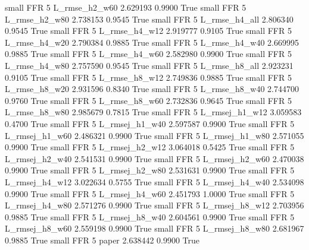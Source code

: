      small      FFR                 5  L_rmse_h2_w60   2.629193      0.9900    True
     small      FFR                 5  L_rmse_h2_w80   2.738153      0.9545    True
     small      FFR                 5  L_rmse_h4_all   2.806340      0.9545    True
     small      FFR                 5  L_rmse_h4_w12   2.919777      0.9105    True
     small      FFR                 5  L_rmse_h4_w20   2.790384      0.9885    True
     small      FFR                 5  L_rmse_h4_w40   2.669995      0.9885    True
     small      FFR                 5  L_rmse_h4_w60   2.582980      0.9900    True
     small      FFR                 5  L_rmse_h4_w80   2.757590      0.9545    True
     small      FFR                 5  L_rmse_h8_all   2.923231      0.9105    True
     small      FFR                 5  L_rmse_h8_w12   2.749836      0.9885    True
     small      FFR                 5  L_rmse_h8_w20   2.931596      0.8340    True
     small      FFR                 5  L_rmse_h8_w40   2.744700      0.9760    True
     small      FFR                 5  L_rmse_h8_w60   2.732836      0.9645    True
     small      FFR                 5  L_rmse_h8_w80   2.985679      0.7815    True
     small      FFR                 5 L_rmsej_h1_w12   3.059583      0.4700    True
     small      FFR                 5 L_rmsej_h1_w40   2.597587      0.9900    True
     small      FFR                 5 L_rmsej_h1_w60   2.486321      0.9900    True
     small      FFR                 5 L_rmsej_h1_w80   2.571055      0.9900    True
     small      FFR                 5 L_rmsej_h2_w12   3.064018      0.5425    True
     small      FFR                 5 L_rmsej_h2_w40   2.541531      0.9900    True
     small      FFR                 5 L_rmsej_h2_w60   2.470038      0.9900    True
     small      FFR                 5 L_rmsej_h2_w80   2.531631      0.9900    True
     small      FFR                 5 L_rmsej_h4_w12   3.022634      0.5755    True
     small      FFR                 5 L_rmsej_h4_w40   2.534098      0.9900    True
     small      FFR                 5 L_rmsej_h4_w60   2.451793      1.0000    True
     small      FFR                 5 L_rmsej_h4_w80   2.571276      0.9900    True
     small      FFR                 5 L_rmsej_h8_w12   2.703956      0.9885    True
     small      FFR                 5 L_rmsej_h8_w40   2.604561      0.9900    True
     small      FFR                 5 L_rmsej_h8_w60   2.559198      0.9900    True
     small      FFR                 5 L_rmsej_h8_w80   2.681967      0.9885    True
     small      FFR                 5          paper   2.638442      0.9900    True
